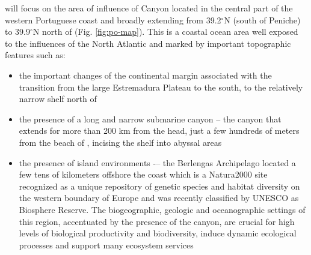 \proj will focus on the area of influence of \naz Canyon located in
the central part of the western Portuguese coast and broadly extending
from 39.2$^{\circ}$N (south of Peniche) to 39.9$^{\circ}$N north of
\naz (Fig. \ref{fig:po-map}). This is a coastal ocean area well
exposed to the influences of the North Atlantic and marked by
important topographic features such as:

\begin{itemize}

\item the important changes of the continental margin associated with
  the transition from the large Estremadura Plateau to the south, to
  the relatively narrow shelf north of \naz

\item the presence of a long and narrow submarine canyon – the \naz
  canyon that extends for more than 200 km from the head, just a few
  hundreds of meters from the beach of \naze, incising the shelf into
  abyssal areas

\item the presence of island environments -– the Berlengas Archipelago
  located a few tens of kilometers offshore the coast which is a
  Natura2000 site recognized as a unique repository of genetic species
  and habitat diversity on the western boundary of Europe and was
  recently classified by UNESCO as Biosphere Reserve. The
  biogeographic, geologic and oceanographic settings of this region,
  accentuated by the presence of the \naz canyon, are crucial for
  high levels of biological productivity and biodiversity, induce
  dynamic ecological processes and support many ecosystem services

\end{itemize}


